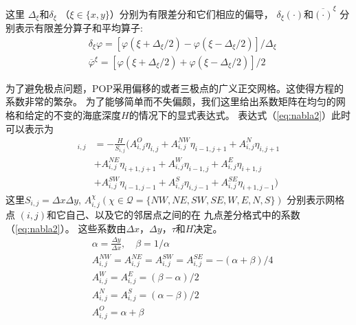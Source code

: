 这里 $\Delta_\xi$和$\delta_\xi$  （$\xi \in \{x, y\} $）分别为有限差分和它们相应的偏导， $\delta_\xi (\cdot) $和$\overline{(\cdot)}^\xi $ 分别表示有限差分算子和平均算子:  
\begin{align}
&\delta_\xi \varphi = [\varphi (\xi+\Delta_\xi/2) -\varphi(\xi-\Delta_\xi/2)]/\Delta_\xi \\
&\overline{\varphi}^\xi  =[\varphi (\xi+\Delta_\xi/2) +\varphi(\xi-\Delta_\xi/2)]/2
\end{align}
 
 

为了避免极点问题，POP采用偏移的或者三极点的广义正交网格。这使得方程的系数非常的繁杂。
为了能够简单而不失偏颇，我们这里给出系数矩阵在均匀的网格和给定的不变的海底深度$H$的情况下的显式表达式。
表达式（\ref{eq:nabla2}）此时可以表示为
\begin{align}
 [\nabla\cdot H \nabla \eta]_{i,j}&= -\frac{H}{S_{i,j}}(A_{i,j}^O\eta_{i,j}+A_{i,j}^{NW}\eta_{i-1,j+1}+A_{i,j}^N\eta_{i,j+1} \nonumber\\
 &+A_{i,j}^{NE}\eta_{i+1,j+1}+A_{i,j}^W\eta_{i-1,j} +A_{i,j}^E\eta_{i+1,j} \nonumber\\
& +A_{i,j}^{SW}\eta_{i-1,j-1} +A_{i,j}^S\eta_{i,j-1}+ A_{i,j}^{SE}\eta_{i+1,j-1})
\end{align}
这里$S_{i,j}  = \Delta x\Delta y$, $A_{i,j}^{\chi } ( \chi \in \mathcal{Q} = \{NW,NE, SW, SE, W, E, N, S\})$ 分别表示网格点 $(i,j)$和它自己、以及它的邻居点之间的在 九点差分格式中的系数（\ref{eq:nabla2}）。 这些系数由$\Delta x$，$\Delta y$，$\tau$和$H$决定。
\begin{equation} \label{defineA}
\begin{aligned}
&\alpha  = \frac{ \Delta y}{ \Delta x }, \quad \beta  = 1/\alpha \\
&A_{i,j}^{NW} = A_{i,j}^{NE} =A_{i,j}^{SW} = A_{i,j}^{SE} = - (\alpha  +  \beta  )/4 \\
&A_{i,j}^{W} = A_{i,j}^{E} = (  \beta  -\alpha  )/2 \\
&A_{i,j}^{N} = A_{i,j}^{S} = (\alpha  -\beta )/2 \\
&A_{i,j}^{O} =   \alpha   +\beta  \\
\end{aligned}
\end{equation}


